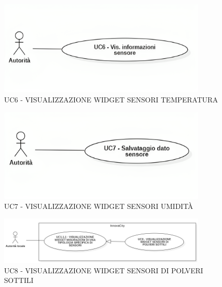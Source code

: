 


\begin{figure}[H]
    \centering
    \includegraphics[width=0.9\textwidth]{../Images/uc6.png}
    \caption{UC6 - VISUALIZZAZIONE WIDGET SENSORI TEMPERATURA}
    \label{fig:UC6}
\end{figure}




\begin{figure}[H]
    \centering
    \includegraphics[width=0.9\textwidth]{../Images/uc7.png}
    \caption{UC7 - VISUALIZZAZIONE WIDGET SENSORI UMIDITÀ}
\end{figure}




\begin{figure}[H]
    \centering
    \includegraphics[width=0.9\textwidth]{../Images/uc8.PNG}
    \caption{UC8 - VISUALIZZAZIONE WIDGET SENSORI DI POLVERI SOTTILI}
\end{figure}


